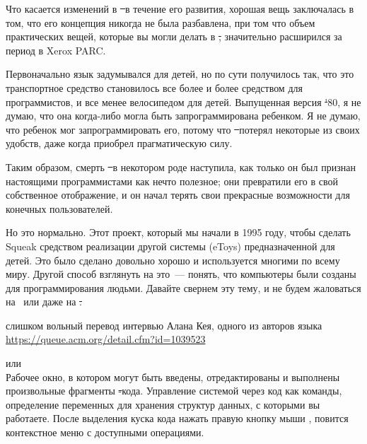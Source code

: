 Что касается изменений в \st\ в течение его развития, хорошая вещь заключалась в том, 
что его концепция никогда не была разбавлена, при том что объем практических вещей, 
которые вы могли делать в \st, значительно расширился за период в Xerox PARC.

Первоначально язык задумывался для детей, но по сути получилось так, что это 
транспортное средство становилось все более и более средством для программистов,
и все менее велосипедом для детей. Выпущенная версия \st'80, я не думаю, 
что она когда-либо могла быть запрограммирована ребенком. 
Я не думаю, что ребенок мог запрограммировать его, потому что \st\ потерял
некоторые из своих удобств, даже когда приобрел прагматическую силу.

Таким образом, смерть \st\ в некотором роде наступила, как только он был 
признан настоящими программистами как нечто полезное; они превратили его 
в свой собственное отображение, и он начал терять свои прекрасные 
возможности для конечных пользователей.

Но это нормально. Этот проект, который мы начали в 1995 году, чтобы сделать Squeak 
средством реализации другой системы (eToys) предназначенной для детей.
Это было сделано довольно хорошо и используется многими по всему миру.
Другой способ взглянуть на это\ --- понять, что компьютеры были созданы для программирования людьми.
Давайте свернем эту тему, и не будем жаловаться на \java\ или даже на \st.

\vspace{1cm}\noindent
слишком вольный перевод
интервью Алана Кея, одного из авторов языка \st\\
\url{https://queue.acm.org/detail.cfm?id=1039523}

\clearpage
{}\label{playground}


\medskip
\noindent{} или \\
Рабочее окно, в котором могут быть введены, отредактированы и выполнены произвольные фрагменты \st-кода.
Управление системой через код как команды, определение переменных для хранения структур данных, с которыми вы работаете.
После выделения куска кода нажать правую кнопку мыши \keys{\rms}, повится контекстное меню с доступными операциями.

\medskip\noindent


